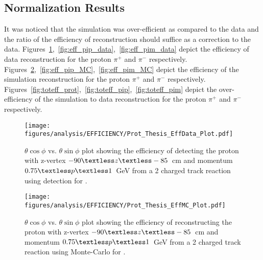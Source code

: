 \subsection{ Normalization Results}
It was noticed that the simulation was over-efficient as compared to the data and the ratio of the efficiency of reconstruction should suffice as a correction to the data. Figures~\ref{fig:eff_prot_data},~\ref{fig:eff_pip_data},~\ref{fig:eff_pim_data} depict the efficiency of data reconstruction for the proton $\pi^+$ and $\pi^-$ respectively. Figures~\ref{fig:eff_prot_MC},~\ref{fig:eff_pip_MC},~\ref{fig:eff_pim_MC} depict the efficiency of the simulation reconstruction for the proton $\pi^+$ and $\pi^-$ respectively. Figures~\ref{fig:toteff_prot},~\ref{fig:toteff_pip},~\ref{fig:toteff_pim} depict the over-efficiency of the simulation to data reconstruction for the proton $\pi^+$ and $\pi^-$ respectively.
\begin{figure}[h!]\begin{center}
\texttt{[image: \\figures/analysis/EFFICIENCY/Prot\_Thesis\_EffData\_Plot.pdf]}
\caption[$\theta \cos\phi$ vs. $\theta \sin\phi$ plot showing the efficiency of detecting the proton with z-vertex $-90\textless z\textless-85$~cm and momentum $0.75\textless p \textless 1$~GeV from a 2 charged track reaction using  detection for ]{\label{fig:eff_prot_data} $\theta \cos\phi$ vs. $\theta \sin\phi$ plot showing the efficiency of detecting the proton with z-vertex $-90\textless z\textless-85$~cm and momentum $0.75\textless p \textless 1$~GeV from a 2 charged track reaction using  detection for .}
\end{center}\end{figure}
%
\begin{figure}[h!]\begin{center}
\texttt{[image: \\figures/analysis/EFFICIENCY/Prot\_Thesis\_EffMC\_Plot.pdf]}
\caption[$\theta \cos\phi$ vs. $\theta \sin\phi$ plot showing the efficiency of reconstructing the proton with z-vertex $-90\textless z\textless-85$~cm and momentum $0.75\textless p \textless 1$~GeV from a 2 charged track reaction using  Monte-Carlo for ]{\label{fig:eff_prot_MC} $\theta \cos\phi$ vs. $\theta \sin\phi$ plot showing the efficiency of reconstructing the proton with z-vertex $-90\textless z\textless-85$~cm and momentum $0.75\textless p \textless 1$~GeV from a 2 charged track reaction using  Monte-Carlo for .}
\end{center}\end{figure}
